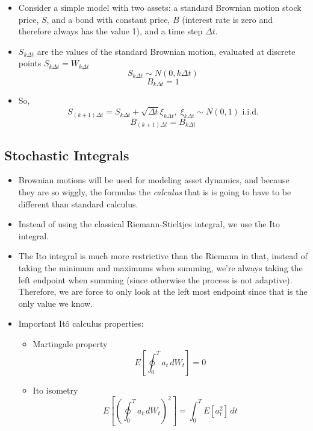 \documentclass[11pt]{article}
\begin{document}
\begin{itemize}
    \item Consider a simple model with two assets: a standard Brownian motion stock price,
    $S$, and a bond with constant price, $B$ (interest rate is zero and therefore always has 
    the value 1), and a time step $\Delta t$.
    \item $S_{k \Delta t}$ are the values of the standard Brownian motion, evaluated at 
    discrete points $S_{k \Delta t} = W_{k \Delta t}$
        \[S_{k \Delta t} \sim N(0, k \Delta t)\]
        \[B_{k \Delta t} = 1\]
    \item So, 
        \[ 
        S_{(k+1) \Delta t} 
        = S_{k \Delta t} + \sqrt{\Delta t} \xi_{k \Delta t}, 
        \; \xi_{k \Delta t} \sim N(0,1) \text{ i.i.d.}
        \]
        \[
        B_{(k+1)\Delta t} = B_{k \Delta t}    
        \]
\end{itemize}


\subsection{Stochastic Integrals}
\begin{itemize}
    \item Brownian motions will be used for modeling asset dynamics, and because they are so 
    wiggly, the formulas \- the \textit{calculus} that is \- is going to have to be different 
    than standard calculus. 
    \item Instead of using the classical Riemann-Stieltjes integral, we use the Ito integral. 
\end{itemize}

\begin{itemize}
    \item The Ito integral is much more restrictive than the Riemann in that, instead of 
    taking the minimum and maximums when summing, we're always taking the left endpoint when 
    summing (since otherwise the process is not adaptive). Therefore, we are force to only 
    look at the left most endpoint since that is the only value we know. 
    \item Important It\^{o} calculus properties: 
    \begin{itemize}
        \item Martingale property 
        \[ E\left[\oint_{0}^{T} a_t \, dW_t \right] = 0\]
        \item Ito isometry
        \[ E \left[{\left(\oint_0^T a_t \, dW_t\right)}^2\right] = \int_{0}^{T} E[a_t^2] \, dt\]
    \end{itemize}
\end{itemize}
\end{document}
